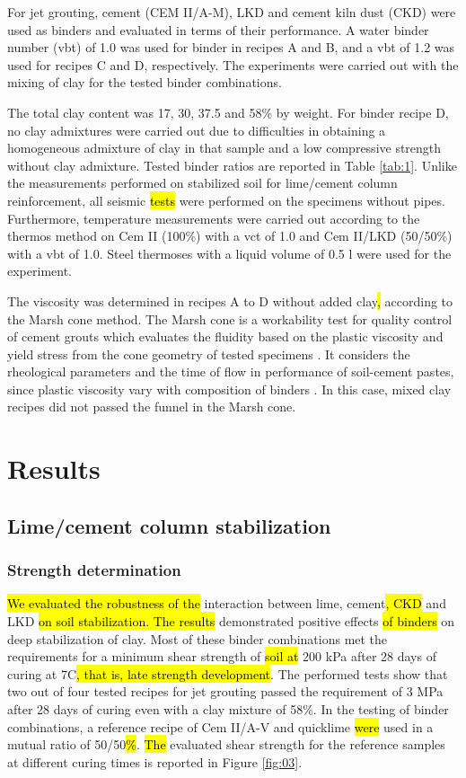 \documentclass[USenglish,twocolumn]{article}
\begin{document}
For jet grouting, cement (CEM II/A-M), LKD and cement kiln dust (CKD) were used as binders and evaluated in terms of their performance. A water binder number (vbt) of 1.0 was used for binder in recipes A and B, and a vbt of 1.2 was used for recipes C and D, respectively. The experiments were carried out with the mixing of clay for the tested binder combinations. 

The total clay content was 17, 30, 37.5 and 58\% by weight. For binder recipe D, no clay admixtures were carried out due to difficulties in obtaining a homogeneous admixture of clay in that sample and a low compressive strength without clay admixture. Tested binder ratios are reported in Table \ref{tab:1}. Unlike the measurements performed on stabilized soil for lime/cement column reinforcement, all seismic \hl{tests} were performed on the specimens without pipes. Furthermore, temperature measurements were carried out according to the thermos method on Cem II (100\%) with a vct of 1.0 and Cem II/LKD (50/50\%) with a vbt of 1.0. Steel thermoses with a liquid volume of 0.5 l were used for the experiment.

The viscosity was determined in recipes A to D without added clay\hl{, }according to the Marsh cone method. The Marsh cone is a workability test for quality control of cement grouts which evaluates the fluidity based on the plastic viscosity and yield stress from the cone geometry of tested specimens \cite{ROUSSEL2005823}. It considers the rheological parameters and the time of flow in performance of soil-cement pastes, since plastic viscosity vary with composition of binders \cite{Banfill,FERRARIS2001245}. In this case,\hl{ }mixed clay recipes did not passed the funnel in the Marsh cone. 

\section{Results}

\subsection{Lime/cement column stabilization}
\subsubsection{Strength determination}
\hl{We evaluated the robustness of the }interaction between lime, cement\hl{, CKD }and LKD \hl{on soil stabilization. The results} demonstrated positive effects \hl{of binders }on deep stabilization of clay. Most of these binder combinations met the requirements for a minimum shear strength of \hl{soil at} 200 kPa after 28 days of curing at 7\degree C\hl{, that is, late strength development}. The performed tests show that two out of four tested recipes for jet grouting passed the requirement of 3 MPa after 28 days of curing even with a clay mixture of 58\%. In the testing of binder combinations, a reference recipe of Cem II/A-V and quicklime \hl{were} used in a mutual ratio of 50/50\hl{\%}. \hl{The }evaluated shear strength for the reference samples at different curing times is reported in Figure \ref{fig:03}.
\end{document}
